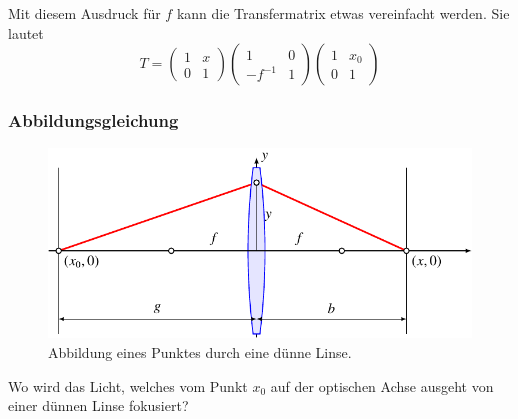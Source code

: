 Mit diesem Ausdruck für $f$ kann die Transfermatrix etwas vereinfacht
werden.
Sie lautet
\begin{equation}
T
=
\begin{pmatrix}1&x\\0&1\end{pmatrix}
\begin{pmatrix}1&0\\-f^{-1}&1\end{pmatrix}
\begin{pmatrix}1&x_0\\0&1\end{pmatrix}
\label{om:fokusmatrix}
\end{equation}

\subsubsection{Abbildungsgleichung}
\begin{figure}
\centering
\includegraphics{applications/matrixoptik/abb.pdf}
\caption{Abbildung eines Punktes durch eine dünne Linse.
\label{mo:abb}}
\end{figure}
Wo wird das Licht, welches vom Punkt $x_0$ auf der optischen
Achse ausgeht von einer dünnen Linse fokusiert?

